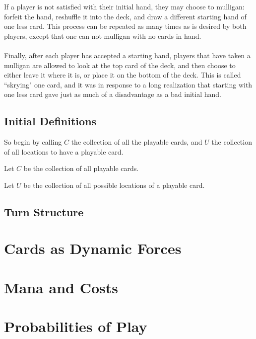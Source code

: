\documentclass{article}
\begin{document}
If a player is not satisfied with their initial hand, they may choose to mulligan: forfeit the hand, reshuffle it into the deck, and draw a different starting hand of one less card. This process can be repeated as many times as is desired by both players, except that one can not mulligan with no cards in hand.

\paragraph{}
Finally, after each player has accepted a starting hand, players that have taken a mulligan are allowed to look at the top card of the deck, and then choose to either leave it where it is, or place it on the bottom of the deck. This is called ``skrying" one card, and it was in response to a long realization that starting with one less card gave just as much of a disadvantage as a bad initial hand.

\subsection{Initial Definitions}
So begin by calling $C$ the collection of all the playable cards, and $U$ the collection of all locations to have a playable card.

\begin{definition}\label{C}
Let $C$ be the collection of all playable cards. 
\end{definition}

\begin{definition}\label{U}
Let $U$ be the collection of all possible locations of a playable card. 
\end{definition}

\subsection{Turn Structure}

\section{Cards as Dynamic Forces}

\section{Mana and Costs}

\section{Probabilities of Play}
\end{document}
